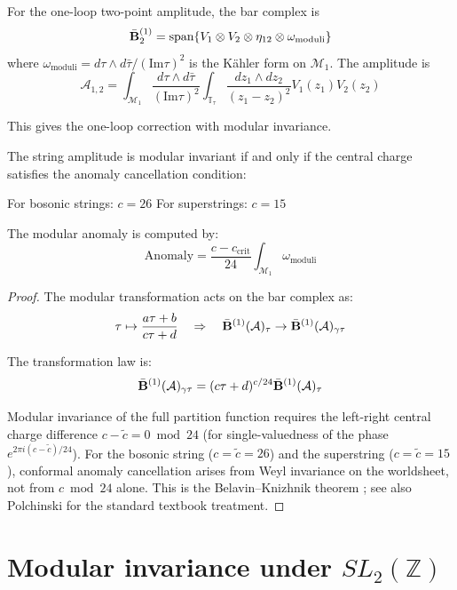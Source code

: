 \begin{example}
For the one-loop two-point amplitude, the bar complex is
\[\bar{\mathbf{B}}^{(1)}_2 = \text{span}\{V_1 \otimes V_2 \otimes \eta_{12} \otimes \omega_{\text{moduli}}\}\]
where $\omega_{\text{moduli}} = d\tau \wedge d\bar{\tau}/(\text{Im}\tau)^2$ is the K\"ahler form on $\mathcal{M}_1$.
The amplitude is
\[\mathcal{A}_{1,2} = \int_{\mathcal{M}_1} \frac{d\tau \wedge d\bar{\tau}}{(\text{Im}\tau)^2} \int_{\mathbb{T}_\tau} \frac{dz_1 \wedge dz_2}{(z_1-z_2)^2} V_1(z_1) V_2(z_2)\]

This gives the one-loop correction with modular invariance.
\end{example}

\begin{theorem}\label{thm:modular-anomaly}
The string amplitude is modular invariant if and only if the central charge satisfies the anomaly cancellation condition:

For bosonic strings: $c = 26$
For superstrings: $c = 15$

The modular anomaly is computed by:
\[\text{Anomaly} = \frac{c - c_{\text{crit}}}{24} \int_{\mathcal{M}_1} \omega_{\text{moduli}}\]
\end{theorem}

\begin{proof}
The modular transformation acts on the bar complex as:
\[\tau \mapsto \frac{a\tau + b}{c\tau + d} \quad \Rightarrow \quad \bar{\mathbf{B}}^{(1)}(\mathcal{A})_\tau \to \bar{\mathbf{B}}^{(1)}(\mathcal{A})_{\gamma\tau}\]

The transformation law is:
\[\bar{\mathbf{B}}^{(1)}(\mathcal{A})_{\gamma\tau} = (c\tau + d)^{c/24} \bar{\mathbf{B}}^{(1)}(\mathcal{A})_\tau\]

Modular invariance of the full partition function requires the left-right central charge difference $c - \tilde{c} = 0 \bmod 24$ (for single-valuedness of the phase $e^{2\pi i (c-\tilde{c})/24}$). For the bosonic string ($c = \tilde{c} = 26$) and the superstring ($c = \tilde{c} = 15$), conformal anomaly cancellation arises from Weyl invariance on the worldsheet, not from $c \bmod 24$ alone. This is the Belavin--Knizhnik theorem \cite{BK86}; see also Polchinski \cite[Ch.~5]{Pol98} for the standard textbook treatment.
\end{proof}

\section{\texorpdfstring{Modular invariance under $SL_2(\mathbb{Z})$}{Modular invariance under SL-2(Z)}}

